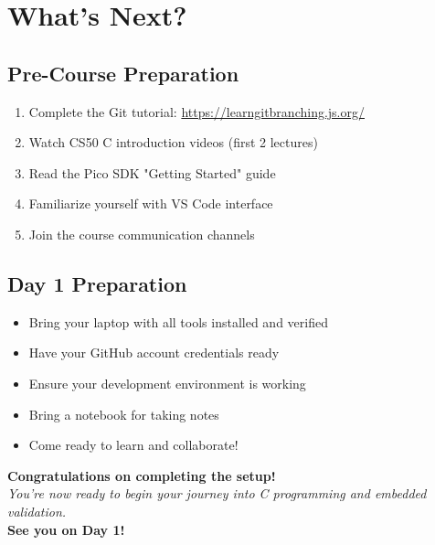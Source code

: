 \documentclass[11pt,a4paper]{article}
\begin{document}
\section{What's Next?}

\subsection{Pre-Course Preparation}
\begin{enumerate}
    \item Complete the Git tutorial: \url{https://learngitbranching.js.org/}
    \item Watch CS50 C introduction videos (first 2 lectures)
    \item Read the Pico SDK "Getting Started" guide
    \item Familiarize yourself with VS Code interface
    \item Join the course communication channels
\end{enumerate}

\subsection{Day 1 Preparation}
\begin{itemize}
    \item Bring your laptop with all tools installed and verified
    \item Have your GitHub account credentials ready
    \item Ensure your development environment is working
    \item Bring a notebook for taking notes
    \item Come ready to learn and collaborate!
\end{itemize}

\vspace{1cm}

\begin{center}
\textbf{Congratulations on completing the setup!}\\
\textit{You're now ready to begin your journey into C programming and embedded validation.}\\
\textbf{See you on Day 1!}
\end{center}
\end{document}
